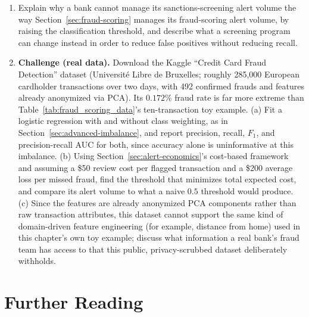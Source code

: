 \documentclass[../ai_in_finance]{subfiles}
\begin{document}
\begin{enumerate}
    \item Explain why a bank cannot manage its sanctions-screening alert volume the way Section~\ref{sec:fraud-scoring} manages its fraud-scoring alert volume, by raising the classification threshold, and describe what a screening program can change instead in order to reduce false positives without reducing recall.
    \item \textbf{Challenge (real data).} Download the Kaggle ``Credit Card Fraud Detection'' dataset (Universit\'e Libre de Bruxelles; roughly 285,000 European cardholder transactions over two days, with 492 confirmed frauds and features already anonymized via PCA). Its $0.172\%$ fraud rate is far more extreme than Table~\ref{tab:fraud_scoring_data}'s ten-transaction toy example. (a) Fit a logistic regression with and without class weighting, as in Section~\ref{sec:advanced-imbalance}, and report precision, recall, $F_1$, and precision-recall AUC for both, since accuracy alone is uninformative at this imbalance. (b) Using Section~\ref{sec:alert-economics}'s cost-based framework and assuming a \$50 review cost per flagged transaction and a \$200 average loss per missed fraud, find the threshold that minimizes total expected cost, and compare its alert volume to what a naive $0.5$ threshold would produce. (c) Since the features are already anonymized PCA components rather than raw transaction attributes, this dataset cannot support the same kind of domain-driven feature engineering (for example, distance from home) used in this chapter's own toy example; discuss what information a real bank's fraud team has access to that this public, privacy-scrubbed dataset deliberately withholds.
\end{enumerate}

\section{Further Reading}
\end{document}
